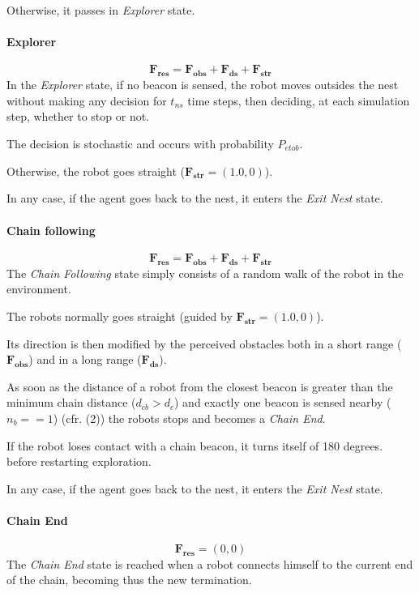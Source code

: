 Otherwise, it passes in \emph{Explorer} state.

\paragraph{Explorer}
\begin{equation}
  \mathbf{F_{res}} = \mathbf{F_{obs}} + \mathbf{F_{ds}} + \mathbf{F_{str}}
\end{equation}
In the \emph{Explorer} state, if no beacon is sensed, the robot moves outsides the nest without making any decision for $t_{ns}$ time steps, then deciding, at each simulation step, whether to stop or not.

The decision is stochastic and occurs with probability $P_{etob}$.

Otherwise, the robot goes straight ($\mathbf{F_{str}} = (1.0,0)$).

In any case, if the agent goes back to the nest, it enters the \emph{Exit Nest} state.

\paragraph{Chain following} \label{par:chainfollowing}
\begin{equation}
  \mathbf{F_{res}} = \mathbf{F_{obs}} + \mathbf{F_{ds}} + \mathbf{F_{str}}
\end{equation}
The \emph{Chain Following} state simply consists of a random walk of the robot 
in the environment.

The robots normally goes straight (guided by $\mathbf{F_{str}} = (1.0,0)$).

Its direction is then modified by the perceived obstacles both in a short range ($\mathbf{F_{obs}}$) and in a long range 
($\mathbf{F_{ds}}$).

As soon as the distance of a robot from the closest beacon is greater than the minimum chain distance ($d_{cb} > d_c$)
and exactly one beacon is sensed nearby ($n_b == 1$) (cfr.  (2)) 
the robots stops and becomes a \emph{Chain End}.

If the robot loses contact with a chain beacon, it turns itself of 180 degrees. before 
restarting exploration.

In any case, if the agent goes back to the nest, it enters the \emph{Exit Nest} state.


\paragraph{Chain End}
\begin{equation}
  \mathbf{F_{res}} = (0,0)
\end{equation}
The \emph{Chain End} state is reached when a robot connects himself to the current end of the chain, becoming thus the new termination.

